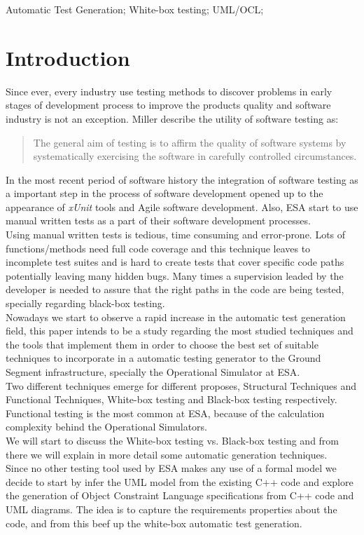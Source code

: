 \documentclass[10pt, conference, compsocconf]{IEEEtran}
\newcommand{\xunit}{\textit{xUnit}}
\begin{document}
\begin{IEEEkeywords}
Automatic Test Generation; White-box testing; UML/OCL;
\end{IEEEkeywords}

\IEEEpeerreviewmaketitle

\section{Introduction}
Since ever, every industry use testing methods to discover problems in early stages of development process to improve
the products quality and software industry is not an exception. Miller\cite{miller} describe the utility
of software testing as:

\begin{quotation}
The general aim of testing is to affirm the quality of software systems by systematically
exercising the software in carefully controlled circumstances.
\end{quotation}

In the most recent period of software history the integration of software testing as a important step in the process of
software development opened up to the appearance of \xunit\cite{xunit} tools and Agile software development.
Also, ESA start to use manual written tests as a part of their software development processes.\\
Using  manual written tests is tedious, time consuming and error-prone. Lots of functions/methods need full code coverage and this technique leaves
to incomplete test suites and is hard to create tests that cover specific code paths potentially leaving many hidden bugs. Many times a supervision leaded by the developer
is needed to assure that the right paths in the code are being tested, specially regarding black-box testing.\\
Nowadays we start to observe a rapid increase in the automatic test generation field, this paper intends to be a study regarding the most studied techniques
and the tools that implement them in order to choose the best set of suitable techniques to incorporate in a automatic testing generator to the
Ground Segment infrastructure, specially the Operational Simulator at ESA.\\
Two different techniques emerge for different proposes, Structural Techniques and Functional Techniques,
White-box testing and Black-box\cite{black} testing respectively. Functional testing is the most common at ESA, because of the calculation complexity
behind the Operational Simulators.\\
We will start to discuss the White-box testing vs. Black-box testing and from there we will explain in more detail some automatic generation techniques.\\
\indent Since no other testing tool used by ESA makes any use of a formal model we decide to start by infer the UML model from the existing C++
code and explore the generation of Object Constraint Language specifications from C++ code and UML diagrams.
The idea is to capture the requirements properties about the code, and from this beef up the white-box automatic test generation.
\end{document}
